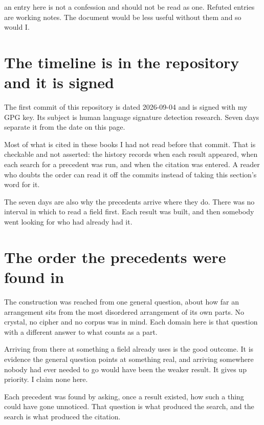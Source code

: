 an entry here is not a confession and should not be read as one. Refuted entries are
working notes. The document would be less useful without them and so would I.

\section*{The timeline is in the repository and it is signed}

The first commit of this repository is dated 2026-09-04 and is signed with my GPG key. Its subject is
human language signature detection research. Seven days separate it from the date on this page.

Most of what is cited in these books I had not read before that commit. That is checkable and not
asserted: the history records when each result appeared, when each search for a precedent was
run, and when the citation was entered. A reader who doubts the order can read it off the commits
instead of taking this section's word for it.

The seven days are also why the precedents arrive where they do. There was no interval in which to
read a field first. Each result was built, and then somebody went looking for who had already had
it.

\section*{The order the precedents were found in}

The construction was reached from one general question, about how far an arrangement sits from the
most disordered arrangement of its own parts. No crystal, no cipher and no corpus was in mind. Each
domain here is that question with a different answer to what counts as a part.

Arriving from there at something a field already uses is the good outcome. It is evidence the
general question points at something real, and arriving somewhere nobody had ever needed to go would
have been the weaker result. It gives up priority. I claim none here.

Each precedent was found by asking, once a result existed, how such a thing could have gone
unnoticed. That question is what produced the search, and the search is what produced the citation.

